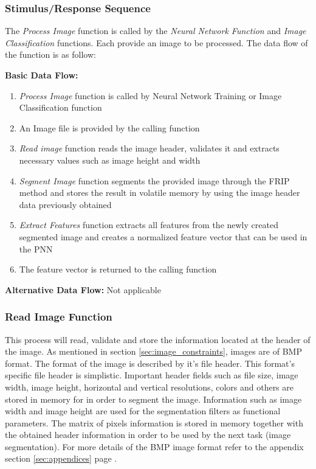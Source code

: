 \documentclass[12pt]{article}
\begin{document}
\subsubsection{Stimulus/Response Sequence}
The \textit{Process Image} function is called by the \textit{Neural
  Network Function} and \textit{Image Classification} functions. Each
provide an image to be processed. The data flow of the function is as
follow:

\textbf{Basic Data Flow:}
\begin{enumerate}
\item \textit{Process Image} function is called by Neural Network
  Training or Image Classification function
\item An Image file is provided by the calling function
\item \textit{Read image} function reads the image header, validates
  it and extracts necessary values such as image height and width
\item \textit{Segment Image} function segments the provided image
  through the FRIP method and stores the result in volatile memory by
  using the image header data previously obtained
\item \textit{Extract Features} function extracts all features from
  the newly created segmented image and creates a normalized feature
  vector that can be used in the PNN
\item The feature vector is returned to the calling function
\end{enumerate}

\textbf{Alternative Data Flow:} Not applicable

\subsubsection{Read Image Function}
\label{sec:read_image_function}
This process will read, validate and store the information located at
the header of the image. As mentioned in section
\ref{sec:image_constraints}, images are of BMP format. The format of
the image is described by it's file header. This format's specific
file header is simplistic. Important header fields such as file size,
image width, image height, horizontal and vertical resolutions, colors
and others are stored in memory for in order to segment the
image. Information such as image width and image height are used for
the segmentation filters as functional parameters. The matrix of
pixels information is stored in memory together with the obtained
header information in order to be used by the next task (image
segmentation). For more details of the BMP image format refer to the
appendix section \ref{sec:appendices} page \pageref{bmp_header}.
\end{document}
